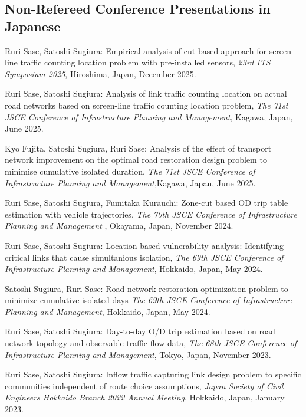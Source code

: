 \documentclass[letterpaper,11pt]{article}
\begin{document}
\subsection*{Non-Refereed Conference Presentations in Japanese}
\begin{enumerate}[leftmargin=0.3in, label=\arabic*.]
    \small{
    \item Ruri Sase, Satoshi Sugiura: Empirical analysis of cut-based approach for screen-line traffic counting location problem with pre-installed sensors, \textit{23rd ITS Symposium 2025}, Hiroshima, Japan, December 2025.
    \item Ruri Sase, Satoshi Sugiura: Analysis of link traffic counting location on actual road networks based on screen-line traffic counting location problem, \textit{The 71st JSCE Conference of Infrastructure Planning and Management}, Kagawa, Japan, June 2025.
    \item Kyo Fujita, Satoshi Sugiura, Ruri Sase: Analysis of the effect of transport network improvement on the optimal road restoration design problem to minimise cumulative isolated duration, \textit{The 71st JSCE Conference of Infrastructure Planning and Management},Kagawa, Japan, June 2025.
    \item Ruri Sase, Satoshi Sugiura, Fumitaka Kurauchi: Zone-cut based OD trip table estimation with vehicle trajectories, \textit{The 70th JSCE Conference of Infrastructure Planning and Management }, Okayama, Japan, November 2024.
    \item Ruri Sase, Satoshi Sugiura: Location-based vulnerability analysis: Identifying critical links that cause simultanious isolation, \textit{The 69th JSCE Conference of Infrastructure Planning and Management}, Hokkaido, Japan, May 2024.
    \item Satoshi Sugiura, Ruri Sase: Road network restoration optimization problem to minimize cumulative isolated days \textit{The 69th JSCE Conference of Infrastructure Planning and Management}, Hokkaido, Japan, May 2024.
    \item Ruri Sase, Satoshi Sugiura: Day-to-day O/D trip estimation based on road network topology and observable traﬃc flow data, \textit{The 68th JSCE Conference of Infrastructure Planning and Management},  Tokyo, Japan, November 2023.
    \item Ruri Sase, Satoshi Sugiura: Inflow traffic capturing link design problem to specific communities independent of route choice assumptions, \textit{Japan Society of Civil Engineers Hokkaido Branch 2022 Annual Meeting}, Hokkaido, Japan, January 2023.
    }
\end{enumerate}
\end{document}
